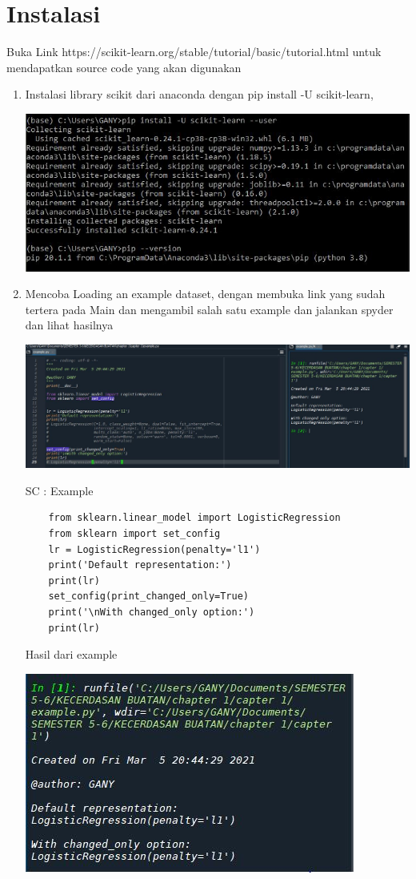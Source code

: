 \section{Instalasi}
Buka Link https://scikit-learn.org/stable/tutorial/basic/tutorial.html untuk mendapatkan source code yang akan digunakan 
\begin{enumerate}
    \item Instalasi library scikit dari anaconda dengan pip install -U scikit-learn, 
     \begin{center}
    \includegraphics[width=.8\textwidth]{figures/1184008/chapter1/1.JPG}
    \end{center}
    \item Mencoba Loading an example dataset, dengan membuka link yang sudah tertera pada Main dan mengambil salah satu example dan jalankan spyder dan lihat hasilnya
     \begin{center}
     \includegraphics[width=.8\textwidth]{figures/1184008/chapter1/2.JPG}
     \end{center}
     SC : Example
     \begin{verbatim}
    from sklearn.linear_model import LogisticRegression
    from sklearn import set_config
    lr = LogisticRegression(penalty='l1')
    print('Default representation:')
    print(lr)
    set_config(print_changed_only=True)
    print('\nWith changed_only option:')
    print(lr)
    \end{verbatim}
     Hasil dari example
     \begin{center}
     \includegraphics[width=.8\textwidth]{figures/1184008/chapter1/2a.JPG}

\end{center}
\end{enumerate}
